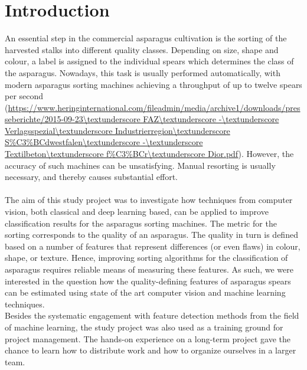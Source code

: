\section{Introduction}

An essential step in the commercial asparagus cultivation is the sorting of the harvested stalks into different quality classes. Depending on size, shape and colour, a label is assigned to the individual spears which determines the class of the asparagus. Nowadays, this task is usually performed automatically, with modern asparagus sorting machines achieving a throughput of up to twelve spears per second (\url{https://www.heringinternational.com/fileadmin/media/archive1/downloads/presseberichte/2015-09-23\textunderscore FAZ\textunderscore -\textunderscore Verlagsspezial\textunderscore Industrierregion\textunderscore S\%C3\%BCdwestfalen\textunderscore -\textunderscore Textilbeton\textunderscore f\%C3\%BCr\textunderscore Dior.pdf}). However, the accuracy of such machines can be unsatisfying. Manual resorting is usually necessary, and thereby causes substantial effort. \\
\\
The aim of this study project was to investigate how techniques from computer vision, both classical and deep learning based, can be applied to improve classification results for the asparagus sorting machines. The metric for the sorting corresponds to the quality of an asparagus. The quality in turn is defined based on a number of features that represent differences (or even flaws) in colour, shape, or texture. Hence, improving sorting algorithms for the classification of asparagus requires reliable means of measuring these features. As such, we were interested in the question how the quality-defining features of asparagus spears can be estimated using state of the art computer vision and machine learning techniques. \\
Besides the systematic engagement with feature detection methods from the field of machine learning, the study project was also used as a training ground for project management. The hands-on experience on a long-term project gave the chance to learn how to distribute work and how to organize ourselves in a larger team. \\
